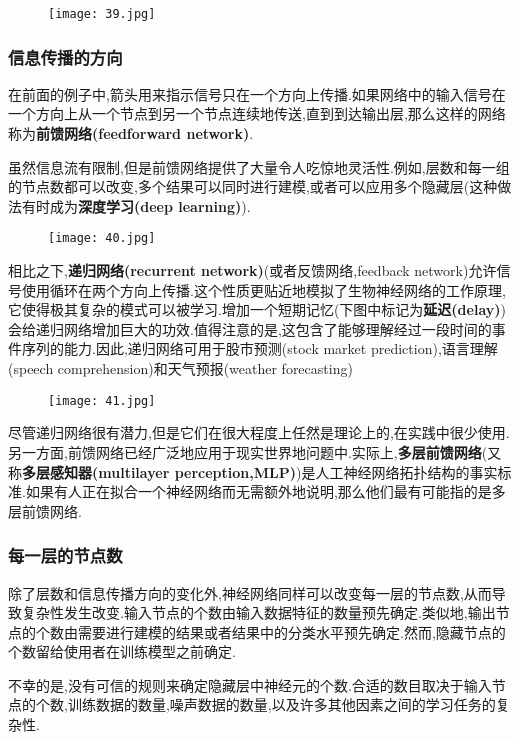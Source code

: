 \documentclass[11pt,a4paper,oneside]{book}
\begin{document}
\begin{figure}[H]
	\centering
	\texttt{[image: 39.jpg]}
\end{figure}
\subsubsection{信息传播的方向}
在前面的例子中,箭头用来指示信号只在一个方向上传播.如果网络中的输入信号在一个方向上从一个节点到另一个节点连续地传送,直到到达输出层,那么这样的网络称为\textbf{前馈网络(feedforward network)}.

虽然信息流有限制,但是前馈网络提供了大量令人吃惊地灵活性.例如,层数和每一组的节点数都可以改变,多个结果可以同时进行建模,或者可以应用多个隐藏层(这种做法有时成为\textbf{深度学习(deep learning)}).

\begin{figure}[H]
	\centering
	\texttt{[image: 40.jpg]}
\end{figure}

相比之下,\textbf{递归网络(recurrent network)}(或者反馈网络,feedback network)允许信号使用循环在两个方向上传播.这个性质更贴近地模拟了生物神经网络的工作原理,它使得极其复杂的模式可以被学习.增加一个短期记忆(下图中标记为\textbf{延迟(delay)})会给递归网络增加巨大的功效.值得注意的是,这包含了能够理解经过一段时间的事件序列的能力.因此,递归网络可用于股市预测(stock market prediction),语言理解(speech comprehension)和天气预报(weather forecasting)

\begin{figure}[H]
	\centering
	\texttt{[image: 41.jpg]}
\end{figure}

尽管递归网络很有潜力,但是它们在很大程度上任然是理论上的,在实践中很少使用.另一方面,前馈网络已经广泛地应用于现实世界地问题中.实际上,\textbf{多层前馈网络}(又称\textbf{多层感知器(multilayer perception,MLP)})是人工神经网络拓扑结构的事实标准.如果有人正在拟合一个神经网络而无需额外地说明,那么他们最有可能指的是多层前馈网络.

\subsubsection{每一层的节点数}
除了层数和信息传播方向的变化外,神经网络同样可以改变每一层的节点数,从而导致复杂性发生改变.输入节点的个数由输入数据特征的数量预先确定.类似地,输出节点的个数由需要进行建模的结果或者结果中的分类水平预先确定.然而,隐藏节点的个数留给使用者在训练模型之前确定.

不幸的是,没有可信的规则来确定隐藏层中神经元的个数.合适的数目取决于输入节点的个数,训练数据的数量,噪声数据的数量,以及许多其他因素之间的学习任务的复杂性.
\end{document}
